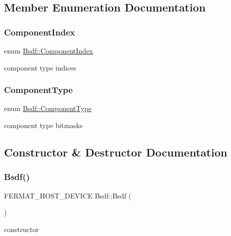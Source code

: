\subsection{Member Enumeration Documentation}
\mbox{\label{struct_bsdf_acaa87fb810c0f7957db85bf41843f70c}} 
\subsubsection{\texorpdfstring{Component\+Index}{ComponentIndex}}
{\footnotesize\ttfamily enum \hyperlink{struct_bsdf_acaa87fb810c0f7957db85bf41843f70c}{Bsdf\+::\+Component\+Index}}

component type indices \mbox{\label{struct_bsdf_a5f7db6f81220ed9ee6da109d6eb5b585}} 
\subsubsection{\texorpdfstring{Component\+Type}{ComponentType}}
{\footnotesize\ttfamily enum \hyperlink{struct_bsdf_a5f7db6f81220ed9ee6da109d6eb5b585}{Bsdf\+::\+Component\+Type}}

component type bitmasks 

\subsection{Constructor \& Destructor Documentation}
\mbox{\label{struct_bsdf_acaba8d34bd0941ee5f693dfd1332192c}} 
\subsubsection{\texorpdfstring{Bsdf()}{Bsdf()}\hspace{0.1cm}{\footnotesize\ttfamily [1/4]}}
{\footnotesize\ttfamily F\+E\+R\+M\+A\+T\+\_\+\+H\+O\+S\+T\+\_\+\+D\+E\+V\+I\+CE Bsdf\+::\+Bsdf (\begin{DoxyParamCaption}{ }\end{DoxyParamCaption})\hspace{0.3cm}{\ttfamily [inline]}}

constructor \mbox{\label{struct_bsdf_afab2b86b817583efe5d2e66b51fce894}} 
